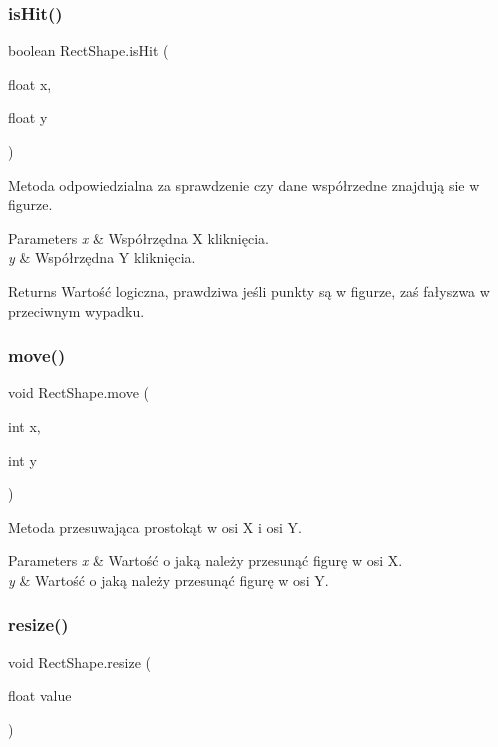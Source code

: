\subsubsection{is\+Hit()}
{\footnotesize\ttfamily boolean Rect\+Shape.\+is\+Hit (\begin{DoxyParamCaption}\item[{float}]{x,  }\item[{float}]{y }\end{DoxyParamCaption})}

Metoda odpowiedzialna za sprawdzenie czy dane współrzedne znajdują sie w figurze. 
\begin{DoxyParams}{Parameters}
{\em x} & Współrzędna X kliknięcia. \\
\hline
{\em y} & Współrzędna Y kliknięcia. \\
\hline
\end{DoxyParams}
\begin{DoxyReturn}{Returns}
Wartość logiczna, prawdziwa jeśli punkty są w figurze, zaś fałyszwa w przeciwnym wypadku. 
\end{DoxyReturn}
\mbox{\label{class_rect_shape_a130c9da5f098dc698d708419f9eff893}} 
\subsubsection{move()}
{\footnotesize\ttfamily void Rect\+Shape.\+move (\begin{DoxyParamCaption}\item[{int}]{x,  }\item[{int}]{y }\end{DoxyParamCaption})}

Metoda przesuwająca prostokąt w osi X i osi Y. 
\begin{DoxyParams}{Parameters}
{\em x} & Wartość o jaką należy przesunąć figurę w osi X. \\
\hline
{\em y} & Wartość o jaką należy przesunąć figurę w osi Y. \\
\hline
\end{DoxyParams}
\mbox{\label{class_rect_shape_aa4fad2d2ada5e571b4293f08818ec133}} 
\subsubsection{resize()}
{\footnotesize\ttfamily void Rect\+Shape.\+resize (\begin{DoxyParamCaption}\item[{float}]{value }\end{DoxyParamCaption})}

